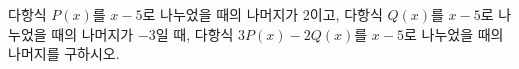 다항식 $P(x)$를 $x-5$로 나누었을 때의 나머지가 $2$이고, 다항식 $Q(x)$를 $x-5$로 나누었을 때의 나머지가 $-3$일 때, 다항식 $3P(x)-2Q(x)$를 $x-5$로 나누었을 때의 나머지를 구하시오.

